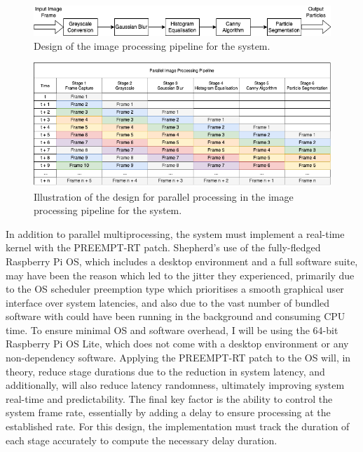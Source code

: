 \begin{figure}[H]
    \centering
    \includegraphics[width=1\textwidth]{assets/image-processing-pipeline.png}
    \caption{Design of the image processing pipeline for the system.}
    \label{fig:processing_pipeline}
\end{figure}

\begin{figure}[H]
    \centering
    \includegraphics[width=1\textwidth]{assets/image_multiprocessing_pipeline.png}
    \caption{Illustration of the design for parallel processing in the image processing pipeline for the system.}
    \label{fig:multiprocessing_pipeline}
\end{figure}

In addition to parallel multiprocessing, the system must implement a real-time kernel with the PREEMPT-RT patch. Shepherd's use of the fully-fledged Raspberry Pi OS, which includes a desktop environment and a full software suite, may have been the reason which led to the jitter they experienced, primarily due to the OS scheduler preemption type which prioritises a smooth graphical user interface over system latencies, and also due to the vast number of bundled software with could have been running in the background and consuming CPU time. To ensure minimal OS and software overhead, I will be using the 64-bit Raspberry Pi OS Lite, which does not come with a desktop environment or any non-dependency software. Applying the PREEMPT-RT patch to the OS will, in theory, reduce stage durations due to the reduction in system latency, and additionally, will also reduce latency randomness, ultimately improving system real-time and predictability. The final key factor is the ability to control the system frame rate, essentially by adding a delay to ensure processing at the established rate. For this design, the implementation must track the duration of each stage accurately to compute the necessary delay duration.
